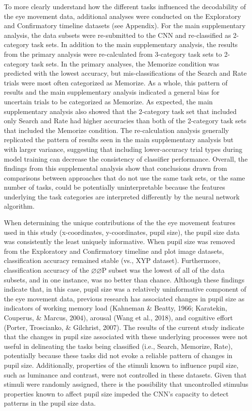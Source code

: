 \documentclass[
  english,
  man, donotrepeattitle,floatsintext]{apa6}
\begin{document}
To more clearly understand how the different tasks influenced the decodability of the eye movement data, additional analyses were conducted on the Exploratory and Confirmatory timeline datasets (see Appendix). For the main supplementary analysis, the data subsets were re-submitted to the CNN and re-classified as 2-category task sets. In addition to the main supplementary analysis, the results from the primary analysis were re-calculated from 3-category task sets to 2-category task sets. In the primary analyses, the Memorize condition was predicted with the lowest accuracy, but mis-classifications of the Search and Rate trials were most often categorized as Memorize. As a whole, this pattern of results and the main supplementary analysis indicated a general bias for uncertain trials to be categorized as Memorize. As expected, the main supplementary analysis also showed that the 2-category task set that included only Search and Rate had higher accuracies than both of the 2-category task sets that included the Memorize condition. The re-calculation analysis generally replicated the pattern of results seen in the main supplementary analysis but with larger variance, suggesting that including lower-accuracy trial types during model training can decrease the consistency of classifier performance. Overall, the findings from this supplemental analysis show that conclusions drawn from comparisons between approaches that do not use the same task sets, or the same number of tasks, could be potentially uninterpretable because the features underlying the task categories are interpreted differently by the neural network algorithm.

When determining the unique contributions of the the eye movement features used in this study (x-coordinates, y-coordinates, pupil size), the pupil size data was consistently the least uniquely informative. When pupil size was removed from the Exploratory and Confirmatory timeline and plot image datasets, classification accuracy remained stable (vs., XYP dataset). Furthermore, classification accuracy of the \(\varnothing\varnothing\)P subset was the lowest of all of the data subsets, and in one instance, was no better than chance. Although these findings indicate that, in this case, pupil size was a relatively uninformative component of the eye movement data, previous research has associated changes in pupil size as indicators of working memory load (Kahneman \& Beatty, 1966; Karatekin, Couperus, \& Marcus, 2004), arousal (Wang et al., 2018), and cognitive effort (Porter, Troscianko, \& Gilchrist, 2007). The results of the current study indicate that the changes in pupil size associated with these underlying processes were not useful in delineating the tasks being classified (i.e., Search, Memorize, Rate), potentially because these tasks did not evoke a reliable pattern of changes in pupil size. Additionally, properties of the stimuli known to influence pupil size, such as luminance and contrast, were not controlled in these datasets. Given that stimuli were randomly assigned, there is the possibility that uncontrolled stimulus properties known to affect pupil size impeded the CNN's capacity to detect patterns in the pupil size data.
\end{document}
